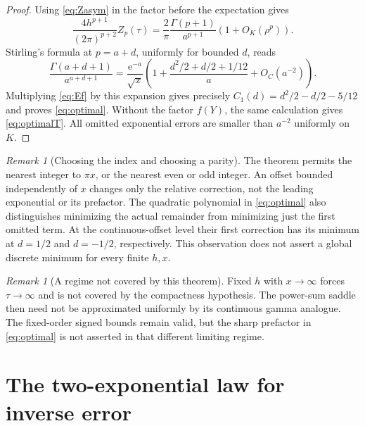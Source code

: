 \documentclass[11pt,a4paper]{article}
\newcommand{\ee}{\mathrm e}
\numberwithin{equation}{section}
\theoremstyle{plain}
\theoremstyle{definition}
\theoremstyle{remark}
\newtheorem{remark}[theorem]{Remark}
\begin{document}
\begin{proof}
Using \eqref{eq:Zasym} in the factor before the expectation gives
\[
 \frac{4h^{p+1}}{(2\pi)^{p+2}}Z_p(\tau)
 =\frac2\pi\frac{\Gamma(p+1)}{a^{p+1}}
                  \left(1+O_K(\rho^p)\right).
\]
Stirling's formula at $p=a+d$, uniformly for bounded $d$, reads
\begin{equation}
 \frac{\Gamma(a+d+1)}{a^{a+d+1}}
 =\frac{\ee^{-a}}{\sqrt{x}}
   \left(1+\frac{d^2/2+d/2+1/12}{a}+O_C(a^{-2})\right).
 \label{eq:stirlingshift}
\end{equation}
Multiplying \eqref{eq:Ef} by this expansion gives precisely
$C_1(d)=d^2/2-d/2-5/12$ and proves \eqref{eq:optimal}. Without the factor
$f(Y)$, the same calculation gives \eqref{eq:optimalT}. All omitted
exponential errors are smaller than $a^{-2}$ uniformly on $K$.
\end{proof}

\begin{remark}[Choosing the index and choosing a parity]
The theorem permits the nearest integer to $\pi x$, or the nearest even or
odd integer. An offset bounded independently of $x$ changes only the
relative correction, not the leading exponential or its prefactor. The
quadratic polynomial in \eqref{eq:optimal} also distinguishes minimizing the
actual remainder from minimizing just the first omitted term. At the
continuous-offset level their first correction has its minimum at $d=1/2$
and $d=-1/2$, respectively. This observation does not assert a global discrete
minimum for every finite $h,x$.
\end{remark}

\begin{remark}[A regime not covered by this theorem]
Fixed $h$ with $x\to\infty$ forces $\tau\to\infty$ and is not covered by the
compactness hypothesis. The power-sum saddle then need not be approximated
uniformly by its continuous gamma analogue. The fixed-order signed bounds
remain valid, but the sharp prefactor in \eqref{eq:optimal} is not asserted in
that different limiting regime.
\end{remark}

\section{The two-exponential law for inverse error}
\label{sec:competition}
\end{document}
